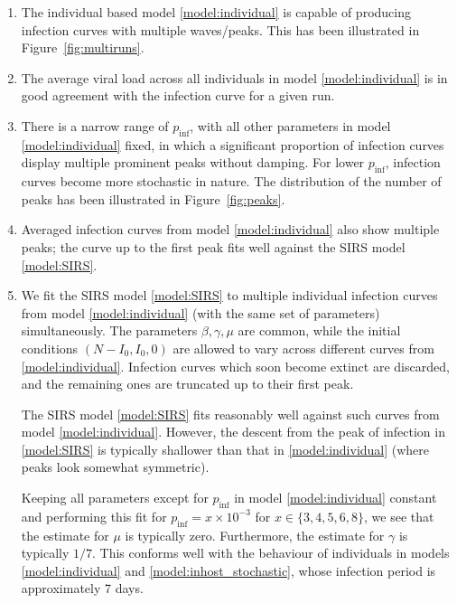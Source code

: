 \documentclass[11pt]{article}
\numberwithin{equation}{subsection}
\begin{document}
    \begin{enumerate}
        \item The individual based model \ref{model:individual} is capable of
        producing infection curves with multiple waves/peaks. This has been
        illustrated in Figure~\ref{fig:multiruns}.

        \item The average viral load across all individuals in model
        \ref{model:individual} is in good agreement with the infection curve
        for a given run.

        \item There is a narrow range of $p_\text{inf}$, with all other
        parameters in model \ref{model:individual} fixed, in which a
        significant proportion of infection curves display multiple prominent
        peaks without damping. For lower $p_\text{inf}$, infection curves
        become more stochastic in nature. The distribution of the number of
        peaks has been illustrated in Figure~\ref{fig:peaks}.

        \item Averaged infection curves from model \ref{model:individual} also
        show multiple peaks; the curve up to the first peak fits well against
        the SIRS model \ref{model:SIRS}.

        \item We fit the SIRS model \ref{model:SIRS} to multiple individual
        infection curves from model \ref{model:individual} (with the same set
        of parameters) simultaneously. The parameters $\beta, \gamma, \mu$ are
        common, while the initial conditions $(N - I_0, I_0, 0)$ are allowed
        to vary across different curves from \ref{model:individual}. Infection
        curves which soon become extinct are discarded, and the remaining ones
        are truncated up to their first peak.

        The SIRS model \ref{model:SIRS} fits reasonably well against such
        curves from model \ref{model:individual}. However, the descent from
        the peak of infection in \ref{model:SIRS} is typically shallower than
        that in \ref{model:individual} (where peaks look somewhat symmetric).

        Keeping all parameters except for $p_\text{inf}$ in model
        \ref{model:individual} constant and performing this fit for
        $p_\text{inf} = x \times 10^{-3}$ for $x \in \{3, 4, 5, 6, 8\}$, we
        see that the estimate for $\mu$ is typically zero. Furthermore, the
        estimate for $\gamma$ is typically $1 / 7$. This conforms well with
        the behaviour of individuals in models \ref{model:individual} and
        \ref{model:inhost_stochastic}, whose infection period is approximately
        7 days.


\end{enumerate}
\end{document}
